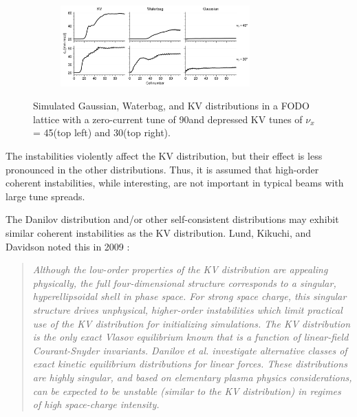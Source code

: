 \begin{figure}[!p]
\begin{subfigure}[b]{0.45\textwidth}
        \label{fig:f2}
    \end{subfigure}
    \vfill
    \begin{subfigure}[b]{\textwidth}
        \centering
        \includegraphics[width=0.8\textwidth]{Images/chapter1/coherent_instability_emittances.png}
        \label{fig:coherent_instabilities_b}
    \end{subfigure}
    \caption{Simulated Gaussian, Waterbag, and KV distributions in a FODO lattice with a zero-current tune of 90\degree and depressed KV tunes of $\nu_x$ = 45\degree (top left) and 30\degree (top right).}
    \label{fig:coherent_instabilities}
\end{figure}
%
The instabilities violently affect the KV distribution, but their effect is less pronounced in the other distributions. Thus, it is assumed that high-order coherent instabilities, while interesting, are not important in typical beams with large tune spreads.

The Danilov distribution and/or other self-consistent distributions may exhibit similar coherent instabilities as the KV distribution. Lund, Kikuchi, and Davidson noted this in 2009 \cite{Lund2009}:
\begin{quote}
    \textit{Although the low-order properties of the KV distribution are appealing physically, the full four-dimensional structure corresponds to a singular, hyperellipsoidal shell in phase space. For strong space charge, this singular structure drives unphysical, higher-order instabilities which limit practical use of the KV distribution for initializing simulations. The KV distribution is the only exact Vlasov equilibrium known that is a function of linear-field Courant-Snyder invariants. Danilov et al. \cite{Danilov2003} investigate alternative classes of exact kinetic equilibrium distributions for linear forces. These distributions are highly singular, and based on elementary plasma physics considerations, can be expected to be unstable (similar to the KV distribution) in regimes of high space-charge intensity.}
\end{quote}
